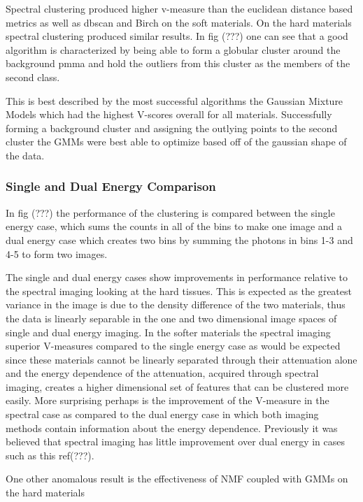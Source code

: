 \documentclass[journal, a4paper]{IEEEtran}
\begin{document}
Spectral clustering produced higher v-measure than the euclidean distance based metrics as well as dbscan and Birch on the soft materials. On the hard materials spectral clustering produced similar results. In fig (???) one can see that a good algorithm is characterized by being able to form a globular cluster around the background pmma and hold the outliers from this cluster as the members of the second class.

This is best described by the most successful algorithms the Gaussian Mixture Models which had the highest V-scores overall for all materials. Successfully forming a background cluster and assigning the outlying points to the second cluster the GMMs were best able to optimize based off of the gaussian shape of the data.

\subsubsection{Single and Dual Energy Comparison}

In fig (???) the performance of the clustering is compared between the single energy case, which sums the counts in all of the bins to make one image and a dual energy case which creates two bins by summing the photons in bins 1-3 and 4-5 to form two images. 

The single and dual energy cases show improvements in performance relative to the spectral imaging looking at the hard tissues. This is expected as the greatest variance in the image is due to the density difference of the two materials, thus the data is linearly separable in the one and two dimensional image spaces of single and dual energy imaging. In the softer materials the spectral imaging superior V-measures compared to the single energy case as would be expected since these materials cannot be linearly separated through their attenuation alone and the energy dependence of the attenuation, acquired through spectral imaging, creates a higher dimensional set of features that can be clustered more easily. More surprising perhaps is the improvement of the V-measure in the spectral case as compared to the dual energy case in which both imaging methods contain information about the energy dependence. Previously it was believed that spectral imaging has little improvement over dual energy in cases such as this ref(???).

One other anomalous result is the effectiveness of NMF coupled with GMMs on the hard materials





    
\end{document}
